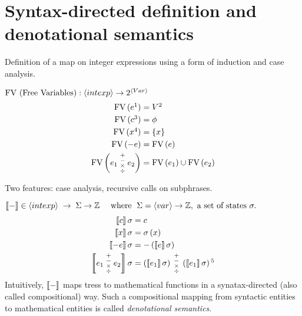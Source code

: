 \section{Syntax-directed definition and denotational semantics}
\begin{enumcirc}
  \item
    Definition of a map on integer expressions using a form of induction and
    case analysis.
  \item
    $
    \textrm{FV (Free Variables)}: \left\langle intexp \right\rangle \rightarrow 2^{\left\langle Var \right\rangle}
    $
    \begin{align*}
      \fv{e\footnotemark} &= V \footnotemark \\
      \fv{c\footnotemark} &= \phi \\
      \fv{x\footnotemark} &= \braces{x} \\
      \fv{-e} &= \fv{e} \\
      \fv{e_1 \; \substack{+\\-\\\times\\\div} \; e_2} &= \fv{e_1} \cup \fv{e_2}
    \end{align*}
    \addtocounter{footnote}{-3} 
     
     
      

  \item
    Two features: case analysis, recursive calls on subphrases.

  \item
    $
      \left\llbracket - \right\rrbracket \in \left\langle intexp \right\rangle \; \rightarrow \;
      \Sigma \rightarrow \mathbb{Z}
      \quad \textrm{ where } \; \Sigma = \left\langle var \right\rangle \rightarrow \mathbb{Z} , \textrm{ a set of states }
      \sigma.
    $
    \begin{align*}
      \bbrackets{c}\sigma &= c \\
      \bbrackets{x}\sigma &= \sigma\prths{x} \\
      \bbrackets{-e}\sigma &= -\prths{\bbrackets{e}\sigma} \\
      \bbrackets{
        e_1 \;\substack{+\\-\\\times\\\div}\; e_2
      }\sigma &= \prths{\bbrackets{e_1}\sigma}
      \;\substack{+\\-\\\times\\\div}\;
      \prths{\bbrackets{e_1}\sigma} \footnotemark
    \end{align*}
    Intuitively, $\left\llbracket - \right\rrbracket$ maps tress to mathematical functions in a
    synatax-directed (also called compositional) way. Such a compositional
    mapping from syntactic entities to mathematical entities is called
    \emph{denotational semantics}.

\end{enumcirc}

